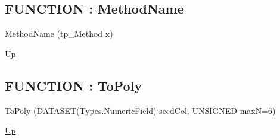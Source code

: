 \subsection*{FUNCTION : MethodName}
\hypertarget{ecldoc:ml_core.generate.methodname}{}
\begin{minipage}[t]{\textwidth}
\begin{flushleft}
 MethodName (tp\_Method x)
\end{flushleft}
\end{minipage}
\hyperlink{ecldoc:ML_Core.Generate}{Up}

\par
\par
\subsection*{FUNCTION : ToPoly}
\hypertarget{ecldoc:ml_core.generate.topoly}{}
\begin{minipage}[t]{\textwidth}
\begin{flushleft}
 ToPoly (DATASET(Types.NumericField) seedCol, UNSIGNED maxN=6)
\end{flushleft}
\end{minipage}
\hyperlink{ecldoc:ML_Core.Generate}{Up}

\par
\par

